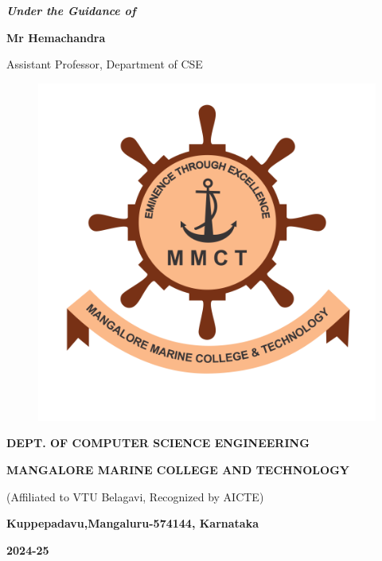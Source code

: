 \documentclass[12pt,a4paper]{report}
\begin{document}
\begin{center}
\vspace{12pt}
\textit{\textbf{Under the Guidance of}}
\par
\vspace{5pt}
\textbf{Mr Hemachandra}
\par
\vspace{1pt}
\normalsize { Assistant Professor, Department of CSE }
\par
\begin{figure}[hbtp]
\centering
\includegraphics[scale=0.5]{MMCT_Logo.png}
\end{figure}
\large \textbf{DEPT. OF COMPUTER SCIENCE ENGINEERING}
\par \textbf{MANGALORE MARINE COLLEGE AND TECHNOLOGY}
\par 

\par
{\large{(Affiliated to VTU Belagavi, Recognized by AICTE)}}
\par
{\large \textbf{Kuppepadavu,Mangaluru-574144, Karnataka}}
\par 
{\Large \textbf{2024-25}}
\end{center}
\newpage
\end{document}
